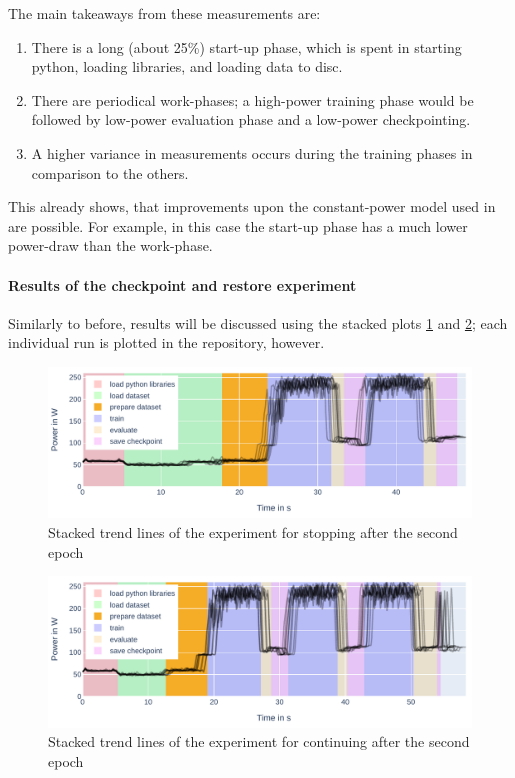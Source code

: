 The main takeaways from these measurements are:

\begin{enumerate}
    \item There is a long (about 25\%) start-up phase, which is spent in starting python, loading libraries, and loading data to disc.
    \item There are periodical work-phases; a high-power training phase would be followed by low-power evaluation phase and a low-power checkpointing.
    \item A higher variance in measurements occurs during the training phases in comparison to the others.
\end{enumerate}

This already shows, that improvements upon the constant-power model used in \cite{wiesner_lets_2021} are possible. 
For example, in this case the start-up phase has a much lower power-draw than the work-phase.

\paragraph{Results of the checkpoint and restore experiment}

Similarly to before, results will be discussed using the stacked plots \ref{fig:plot_partial_saved_stacked} and \ref{fig:plot_partial_saved_continue_stacked}; each individual run is plotted in the repository, however.

\begin{figure}
    \includegraphics[width=\linewidth]{power-measurements/stacked_plots/roberta_stop_after_saving.pdf}
    \caption{Stacked trend lines of the experiment for stopping after the second epoch}
    \label{fig:plot_partial_saved_stacked}
\end{figure}

\begin{figure}
    \includegraphics[width=\linewidth]{power-measurements/stacked_plots/roberta_continue_after_saving.pdf}
    \caption{Stacked trend lines of the experiment for continuing after the second epoch}
    \label{fig:plot_partial_saved_continue_stacked}
\end{figure}

